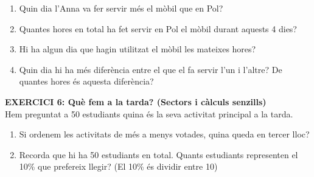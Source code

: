 \documentclass[12pt,a4paper]{article}
\begin{document}
\begin{enumerate}[label=\alph*)]
    \item Quin dia l'Anna va fer servir més el mòbil que en Pol?
    \vspace{0.6cm}
    \item Quantes hores en total ha fet servir en Pol el mòbil durant aquests 4 dies?
    \vspace{0.6cm}
    \item Hi ha algun dia que hagin utilitzat el mòbil les mateixes hores?
    \vspace{0.6cm}
    \item Quin dia hi ha més diferència entre el que el fa servir l'un i l'altre? De quantes hores és aquesta diferència?
    \vspace{0.6cm}
\end{enumerate}

\noindent \textbf{EXERCICI 6: Què fem a la tarda? (Sectors i càlculs senzills)} \\
Hem preguntat a 50 estudiants quina és la seva activitat principal a la tarda. 

\begin{center}
\end{center}

\begin{enumerate}[label=\alph*)]
    \item Si ordenem les activitats de més a menys votades, quina queda en tercer lloc?
    \vspace{0.6cm}
    \item Recorda que hi ha 50 estudiants en total. Quants estudiants representen el 10\% que prefereix llegir? (El 10\% és dividir entre 10)
    \vspace{0.6cm}
\end{enumerate}
\end{document}

